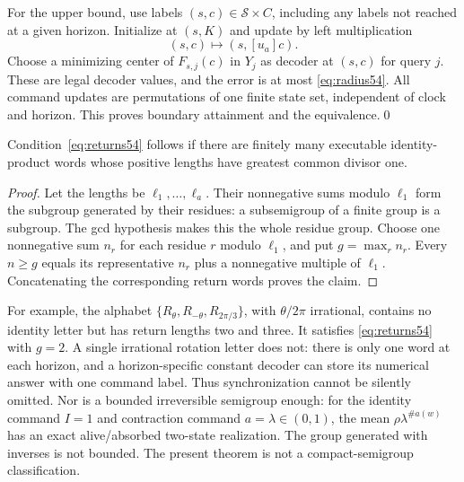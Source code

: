 For the upper bound, use labels $(s,c)\in\mathcal S\times C$, including any labels not reached at a given horizon. Initialize at $(s,K)$ and update by left multiplication
\[
 (s,c)\longmapsto(s,[u_a]c).
\]
Choose a minimizing center of $F_{s,j}(c)$ in $Y_j$ as decoder at $(s,c)$ for query $j$. These are legal decoder values, and the error is at most \eqref{eq:radius54}. All command updates are permutations of one finite state set, independent of clock and horizon. This proves boundary attainment and the equivalence.\qed

\begin{proposition}\label{prop:return54}
Condition~\eqref{eq:returns54} follows if there are finitely many executable identity-product words whose positive lengths have greatest common divisor one.
\end{proposition}
\begin{proof}
Let the lengths be $\ell_1,\ldots,\ell_a$. Their nonnegative sums modulo $\ell_1$ form the subgroup generated by their residues: a subsemigroup of a finite group is a subgroup. The gcd hypothesis makes this the whole residue group. Choose one nonnegative sum $n_r$ for each residue $r$ modulo $\ell_1$, and put $g=\max_r n_r$. Every $n\ge g$ equals its representative $n_r$ plus a nonnegative multiple of $\ell_1$. Concatenating the corresponding return words proves the claim.
\end{proof}
For example, the alphabet $\{R_\theta,R_{-\theta},R_{2\pi/3}\}$, with $\theta/2\pi$ irrational, contains no identity letter but has return lengths two and three. It satisfies \eqref{eq:returns54} with $g=2$. A single irrational rotation letter does not: there is only one word at each horizon, and a horizon-specific constant decoder can store its numerical answer with one command label. Thus synchronization cannot be silently omitted. Nor is a bounded irreversible semigroup enough: for the identity command $I=1$ and contraction command $a=\lambda\in(0,1)$, the mean $\rho\lambda^{\#a(w)}$ has an exact alive/absorbed two-state realization. The group generated with inverses is not bounded. The present theorem is not a compact-semigroup classification.
